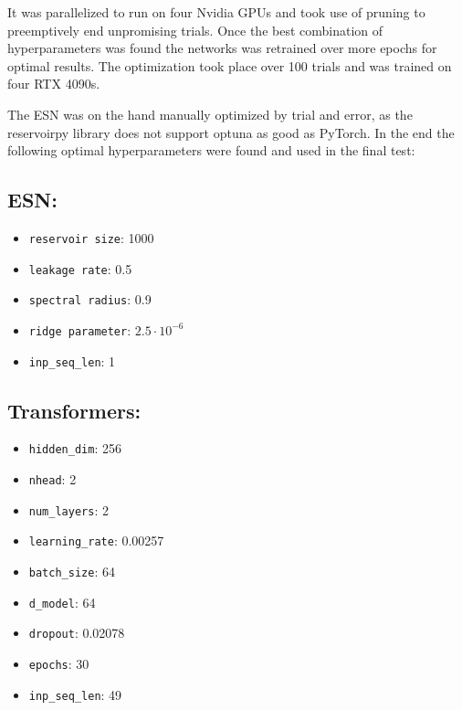 \documentclass[11pt]{article}
\begin{document}
It was parallelized to run on four Nvidia GPUs and took use of pruning to preemptively end unpromising trials. Once the best combination of hyperparameters was found the networks was retrained over more epochs for optimal results. The optimization took place over 100 trials and was trained on four RTX 4090s.

The ESN was on the hand manually optimized by trial and error, as the reservoirpy library does not support optuna as good as PyTorch. In the end the following optimal hyperparameters were found and used in the final test:

\raggedcolumns
\begin{multicols}{3}
    \subsection*{ESN:}
    \begin{itemize}
        \item \texttt{reservoir size}: 1000
        \item \texttt{leakage rate}: 0.5
        \item \texttt{spectral radius}: 0.9
        \item \texttt{ridge parameter}: \(2.5 \cdot 10^{-6}\)
        \item \texttt{inp\_seq\_len}: 1 
    \end{itemize}

    \subsection*{Transformers:}
    \begin{itemize}
        \item \texttt{hidden\_dim}: 256
        \item \texttt{nhead}: 2
        \item \texttt{num\_layers}: 2
        \item \texttt{learning\_rate}: 0.00257 
        \item \texttt{batch\_size}: 64
        \item \texttt{d\_model}: 64
        \item \texttt{dropout}: 0.02078 
        \item \texttt{epochs}: 30
        \item \texttt{inp\_seq\_len}: 49
    \end{itemize}


\end{multicols}
\end{document}
